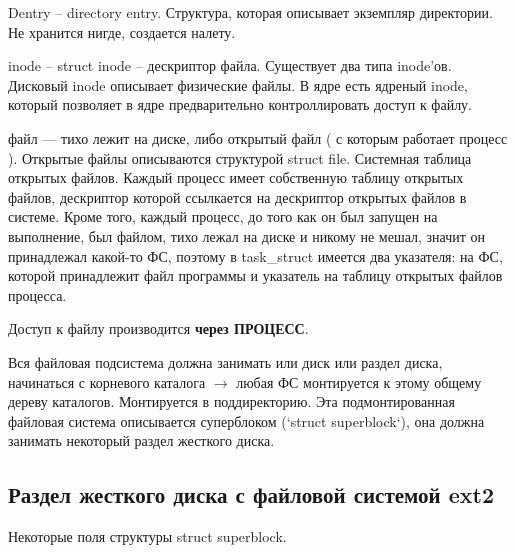 \documentclass[a4paper,12pt]{article}
\begin{document}
Dentry -- directory entry. Структура, которая описывает экземпляр директории. Не хранится нигде, создается налету.

inode -- struct inode -- дескриптор файла. Существует два типа inode'ов. Дисковый inode описывает физические файлы. В ядре есть ядреный inode, который позволяет в ядре предварительно контроллировать доступ к файлу.

файл --- тихо лежит на диске, либо открытый файл ( с которым работает процесс ). Открытые файлы описываются структурой struct file. Системная таблица открытых файлов. Каждый процесс имеет собственную таблицу открытых файлов, дескриптор которой ссылкается на дескриптор открытых файлов в системе. Кроме того, каждый процесс, до того как он был запущен на выполнение, был файлом, тихо лежал на диске и никому не мешал, значит он принадлежал какой-то ФС, поэтому в task\_struct имеется два указателя: на ФС, которой принадлежит файл программы и указатель на таблицу открытых файлов процесса.

Доступ к файлу производится \textbf{через ПРОЦЕСС}.

Вся файловая подсистема должна занимать или диск или раздел диска, начинаться с корневого каталога $\rightarrow$ любая ФС монтируется к этому общему дереву каталогов. Монтируется в поддиректорию. Эта подмонтированная файловая система описывается суперблоком (`struct superblock`), она должна занимать некоторый раздел жесткого диска.

\subsection{Раздел жесткого диска с файловой системой ext2}

Некоторые поля структуры struct superblock.
\end{document}
